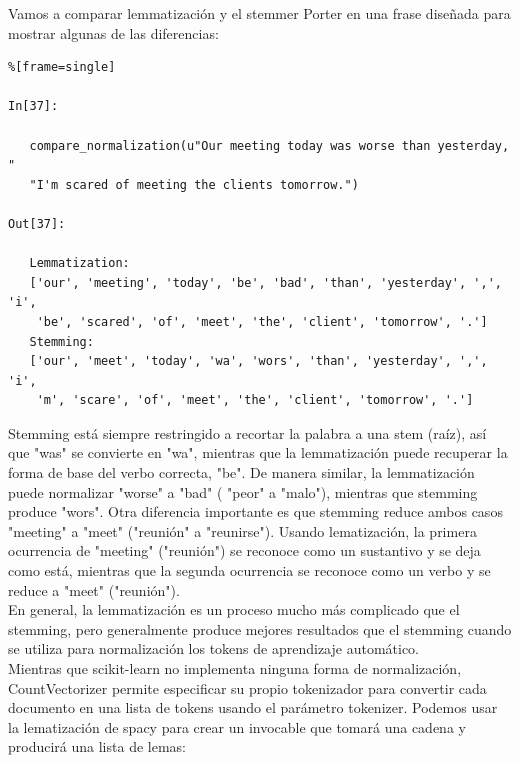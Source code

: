 Vamos a comparar lemmatización y el stemmer Porter en una frase diseñada para mostrar algunas de las diferencias:

\begin{lstlisting}%[frame=single]

In[37]:

   compare_normalization(u"Our meeting today was worse than yesterday, "
   "I'm scared of meeting the clients tomorrow.")

Out[37]:

   Lemmatization:
   ['our', 'meeting', 'today', 'be', 'bad', 'than', 'yesterday', ',', 'i',
    'be', 'scared', 'of', 'meet', 'the', 'client', 'tomorrow', '.']
   Stemming:
   ['our', 'meet', 'today', 'wa', 'wors', 'than', 'yesterday', ',', 'i', 
    'm', 'scare', 'of', 'meet', 'the', 'client', 'tomorrow', '.']

\end{lstlisting}

Stemming está siempre  restringido  a recortar la palabra a una stem (raíz), así que "{}was"{} 
se convierte en "{}wa"{}, mientras que la lemmatización puede recuperar la forma de
 base del verbo  correcta, "{}be"{}. De manera similar, la lemmatización puede normalizar  
 "{}worse"{}  a "{}bad"{}  ( "{}peor"{} a "{}malo"{}), mientras que stemming 
  produce  "{}wors"{}. 
Otra diferencia importante es que stemming  reduce ambos casos  "{}meeting"{ } a
"{}meet"{ }   ("{}reunión"{}  a "{}reunirse"{}).
 Usando lematización, la primera ocurrencia  de  "{}meeting"{}   ("{}reunión"{})  se reconoce
  como un sustantivo y se deja como está, mientras que la segunda ocurrencia se reconoce como un 
 verbo y se reduce a  "{}meet"{} ("{}reunión"{}).  \\


En general, la lemmatización es un proceso mucho más complicado que el stemming, 
pero generalmente produce mejores resultados  que el stemming cuando se utiliza 
para  normalización  los tokens de aprendizaje automático.\\


Mientras que {\ttfamily scikit-learn} no implementa ninguna forma de normalización, {\ttfamily CountVectorizer} permite especificar su propio tokenizador  para convertir cada documento 
en una lista de tokens usando el parámetro {\ttfamily tokenizer}. 
Podemos usar la lematización de {\ttfamily spacy} para crear un invocable que tomará una 
cadena y producirá una lista de lemas:




